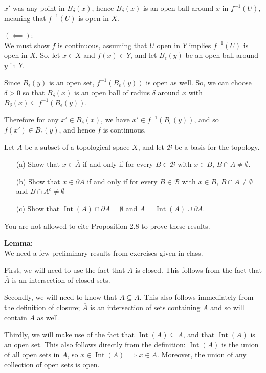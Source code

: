 \documentclass{homework}
\newcommand{\calB}{\mathcal{B}}
\DeclareMathOperator{\Int}{\mathrm{Int}}
\begin{document}
$x'$ was any point in $B_\delta(x)$, hence $B_\delta(x)$
is an open ball around $x$
in $f^{-1}(U)$, meaning that $f^{-1}(U)$ is open in $X$.

$(\impliedby)$:\\
We must show $f$ is continuous,
assuming that $U$ open in $Y$ implies $f^{-1}(U)$ is open in $X$.  So,
let $x\in X$ and $f(x)\in Y$, and let $B_\epsilon(y)$ be an open
ball around $y$ in $Y$.

Since $B_\epsilon(y)$ is an open set, $f^{-1}(B_\epsilon(y))$ is
open as well.  So, we can choose $\delta>0$ so that $B_\delta(x)$
is an open ball of radius $\delta$
around $x$ with $B_\delta(x)\subseteq f^{-1}(B_\epsilon(y))$.

Therefore for any $x'\in B_\delta(x)$, we have $x'\in f^{-1}(B_\epsilon(y))$,
and so $f(x')\in B_\epsilon(y)$, and hence $f$ is
continuous.

\hrulefill
\begin{exercise}{6}
 Let $A$ be a subset of a topological space $X$, and let $\calB$ be
a basis for the topology.
\begin{itemize}
\item[(a)] Show that $x\in\overline{A}$ if and only if for
every $B\in\calB$ with $x\in B$, $B\cap A\neq\emptyset$.
\item[(b)] Show that $x\in\partial A$ if and only if for every $B\in\calB$
with $x\in B$, $B\cap A\neq\emptyset$
and $B\cap A^c\neq \emptyset$
\item[(c)] Show that $\Int(A)\cap\partial A = \emptyset$ and
$\overline{A}=\Int(A)\cup \partial A$.
\end{itemize}
You are not allowed to cite Proposition 2.8 to prove these results.
\end{exercise}
\solution

\textbf{Lemma:}\\
We need a few preliminary results from exercises given in class.

First, we will need to use the fact that $\overline{A}$ is closed.
This follows from the fact that
$\overline{A}$ is an intersection of closed sets.

Secondly, we will need to know that $A\subseteq\overline{A}$.  This also follows
immediately from the definition of closure; $\overline{A}$ is an intersection
of sets containing $A$ and so will contain $A$ as well.

Thirdly, we will make use of the fact that $\Int(A)\subseteq A$, and that
$\Int(A)$ is an open set.  This also
follows directly from the definition: $\Int(A)$ is the union of all open sets
in $A$, so $x\in\Int(A)\implies x\in A$.  Moreover, the union of any collection
of open sets is open.
\end{document}

